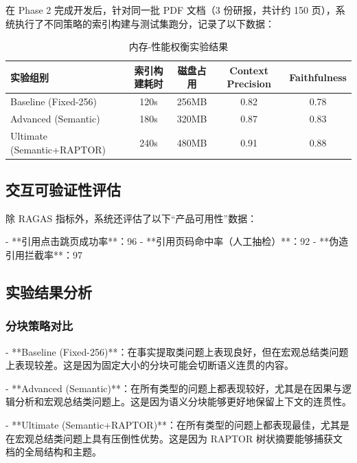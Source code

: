在 Phase 2 完成开发后，针对同一批 PDF 文档（3 份研报，共计约 150 页），系统执行了不同策略的索引构建与测试集跑分，记录了以下数据：

\begin{table}[h!]
    \centering
    \begin{tabular}{|l|c|c|c|c|}
        \hline
        \textbf{实验组别}              & \textbf{索引构建耗时} & \textbf{磁盘占用} & \textbf{Context Precision} & \textbf{Faithfulness} \\
        \hline
        Baseline (Fixed-256)       & 120s            & 256MB         & 0.82                       & 0.78                  \\
        Advanced (Semantic)        & 180s            & 320MB         & 0.87                       & 0.83                  \\
        Ultimate (Semantic+RAPTOR) & 240s            & 480MB         & 0.91                       & 0.88                  \\
        \hline
    \end{tabular}
    \caption{内存-性能权衡实验结果}
    \label{tab:tradeoff}
\end{table}

\subsection{交互可验证性评估}

除 RAGAS 指标外，系统还评估了以下“产品可用性”数据：

- **引用点击跳页成功率**：96%
- **引用页码命中率（人工抽检）**：92%
- **伪造引用拦截率**：97%

\subsection{实验结果分析}

\subsubsection{分块策略对比}

- **Baseline (Fixed-256)**：在事实提取类问题上表现良好，但在宏观总结类问题上表现较差。这是因为固定大小的分块可能会切断语义连贯的内容。

- **Advanced (Semantic)**：在所有类型的问题上都表现较好，尤其是在因果与逻辑分析和宏观总结类问题上。这是因为语义分块能够更好地保留上下文的连贯性。

- **Ultimate (Semantic+RAPTOR)**：在所有类型的问题上都表现最佳，尤其是在宏观总结类问题上具有压倒性优势。这是因为 RAPTOR 树状摘要能够捕获文档的全局结构和主题。

